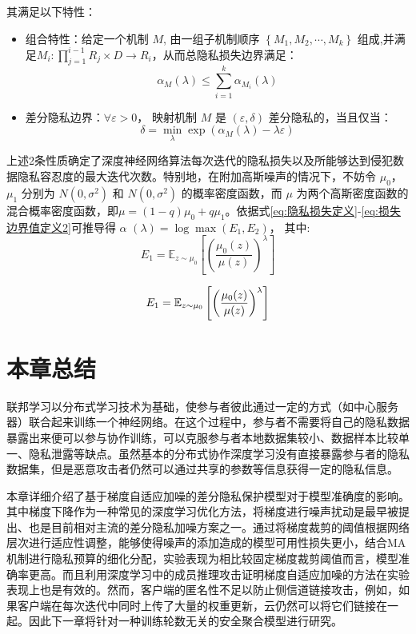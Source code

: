 其满足以下特性：

\begin{itemize}
\item 组合特性：给定一个机制 $M$, 由一组子机制顺序 $\left\{M_{1}, M_{2}, \cdots, M_{k}\right\}$ 组成,并满足$M_{i}: \prod_{j=1}^{i-1} R_{j} \times D \rightarrow R_{i}$，从而总隐私损失边界满足：
\begin{equation}\label{eq:损失边界值定义2}
\alpha_{M}(\lambda) \leqslant \sum_{i=1}^{k} \alpha_{M_{i}}(\lambda)
\end{equation}

\item 差分隐私边界：$\forall \varepsilon>0$， 映射机制 $M$ 是 $(\varepsilon,\delta)$ 差分隐私的，当且仅当：
\begin{equation}\label{eq:损失边界值定义2}
\delta=\min _{\lambda} \exp \left(\alpha_{M}(\lambda)-\lambda \varepsilon\right)
\end{equation}
\end{itemize}

上述2条性质确定了深度神经网络算法每次迭代的隐私损失以及所能够达到侵犯数据隐私容忍度的最大迭代次数。特别地，在附加高斯噪声的情况下，不妨令 $\mu_{0}$，$\mu_{1}$ 分别为 $N\left(0,\sigma^{2}\right)$ 和 $N\left(0,\sigma^{2}\right)$ 的概率密度函数，而 $\mu$ 为两个高斯密度函数的混合概率密度函数，即$\mu=(1-q) \mu_{0}+q \mu_{1}$。依据式\ref{eq:隐私损失定义}-\ref{eq:损失边界值定义2}可推导得 $\alpha$ $(\lambda)=\log \max \left(E_{1},E_{2}\right)$， 其中:
\begin{equation}\label{eq:隐私容忍1}
E_{1}=\mathbb{E}_{z \sim \mu_{0}}\left[\left(\frac{\mu_{0}(z)}{\mu(z)}\right)^{\lambda}\right]
\end{equation}

\begin{equation}\label{eq:隐私{}容忍2}
E_{1}=\mathbb{E}_{z \sim \mu_{0}}\left[\left(\frac{\mu_{0}(z)}{\mu(z)}\right)^{\lambda}\right]
\end{equation}

\section{本章总结}
联邦学习以分布式学习技术为基础，使参与者彼此通过一定的方式（如中心服务器）联合起来训练一个神经网络。在这个过程中，参与者不需要将自己的隐私数据暴露出来便可以参与协作训练，可以克服参与者本地数据集较小、数据样本比较单一、隐私泄露等缺点。虽然基本的分布式协作深度学习没有直接暴露参与者的隐私数据集，但是恶意攻击者仍然可以通过共享的参数等信息获得一定的隐私信息。 

本章详细介绍了基于梯度自适应加噪的差分隐私保护模型对于模型准确度的影响。其中梯度下降作为一种常见的深度学习优化方法，将梯度进行噪声扰动是最早被提出、也是目前相对主流的差分隐私加噪方案之一。通过将梯度裁剪的阈值根据网络层次进行适应性调整，能够使得噪声的添加造成的模型可用性损失更小，结合MA机制进行隐私预算的细化分配，实验表现为相比较固定梯度裁剪阈值而言，模型准确率更高。而且利用深度学习中的成员推理攻击证明梯度自适应加噪的方法在实验表现上也是有效的。然而，客户端的匿名性不足以防止侧信道链接攻击，例如，如果客户端在每次迭代中同时上传了大量的权重更新，云仍然可以将它们链接在一起。因此下一章将针对一种训练轮数无关的安全聚合模型进行研究。

